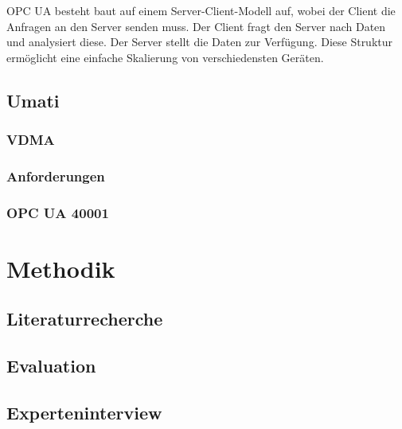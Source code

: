 \documentclass[a4paper, 12pt, oneside]{scrbook}
\begin{document}
	\noindent OPC UA besteht baut auf einem Server-Client-Modell auf, wobei der Client die Anfragen an den Server senden muss. Der Client fragt den Server nach Daten und analysiert diese. Der Server stellt die Daten zur Verfügung. Diese Struktur ermöglicht eine einfache Skalierung von verschiedensten Geräten. 
	
		
	
	\section{Umati}
	
	
		\subsection{VDMA}
		\subsection{Anforderungen}
		\subsection{OPC UA 40001}
		
		
	
\chapter{Methodik}
	
	
	
	\section{Literaturrecherche}
	
	\section{Evaluation}
	
	\section{Experteninterview}
	
\end{document}

